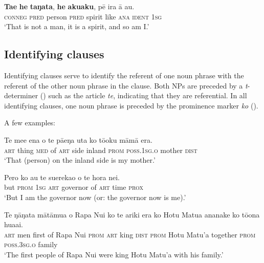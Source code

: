 \ea\label{ex:9.8}
\gll \textbf{Ta{\ꞌ}e} \textbf{he} \textbf{taŋata}, \textbf{he} \textbf{{\ꞌ}aku{\ꞌ}aku}, pē ira {\ꞌ}ā au. \\
\textsc{conneg} \textsc{pred} person \textsc{pred} spirit like \textsc{ana} \textsc{ident} \textsc{1sg} \\

\glt 
‘That is not a man, it is a spirit, and so am I.’ \textstyleExampleref{[Mtx-7-04.058]}
\z
{}

\subsection{Identifying clauses}\label{sec:9.2.2}
Identifying clauses serve to identify the referent of one noun phrase with the referent of the other noun phrase in the clause. Both NPs are preceded by a \textit{t}{}-determiner () such as the article \textit{te}, indicating that they are referential. In all identifying clauses, one noun phrase is preceded by the prominence marker \textit{ko} (). 

A few examples:

\ea\label{ex:9.9}
\gll Te me{\ꞌ}e ena o te pā{\ꞌ}eŋa {\ꞌ}uta ko tō{\ꞌ}oku māmā era. \\
\textsc{art} thing \textsc{med} of \textsc{art} side inland \textsc{prom} \textsc{poss.1sg.o} mother \textsc{dist} \\

\glt 
‘That (person) on the inland side is my mother.’ \textstyleExampleref{[R411.057]} 
\z

\ea\label{ex:9.10}
\gll Pero ko au te suerekao o te hora nei. \\
but \textsc{prom} \textsc{1sg} \textsc{art} governor of \textsc{art} time \textsc{prox} \\

\glt 
‘But I am the governor now (or: the governor now is me).’ \textstyleExampleref{[R201.007]} 
\z

\ea\label{ex:9.11}
\gll Te ŋāŋata mātāmu{\ꞌ}a o Rapa Nui ko te {\ꞌ}ariki era ko Hotu Matu{\ꞌ}a  ananake ko tō{\ꞌ}ona hua{\ꞌ}ai.\\
\textsc{art} men first of Rapa Nui \textsc{prom} \textsc{art} king \textsc{dist} \textsc{prom} Hotu Matu’a  together \textsc{prom} \textsc{poss.3sg.o} family\\

\glt
‘The first people of Rapa Nui were king Hotu Matu’a with his family.’ \textstyleExampleref{[R350.015]} 
\z

